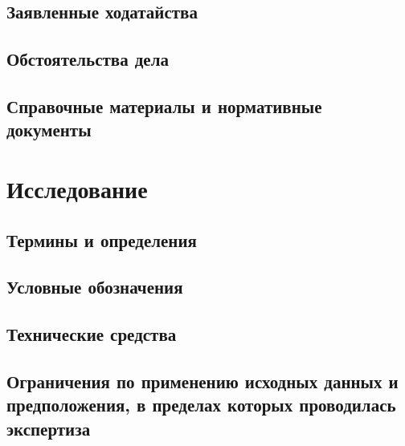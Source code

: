 \documentclass[a4paper,12pt]{article}
\begin{document}
\subsection{Заявленные ходатайства}


\subsection{Обстоятельства дела}


\subsection{Справочные материалы и нормативные документы}



\section{Исследование}


\subsection{Термины и определения}


\subsection{Условные обозначения}


\subsection{Технические средства}


\subsection{Ограничения по применению исходных данных и предположения, в пределах которых проводилась экспертиза}



%

%
%
\end{document}
